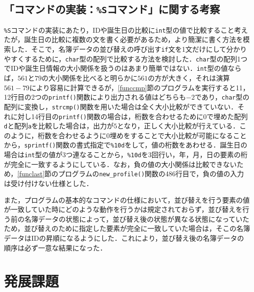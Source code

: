 \subsection{「コマンドの実装：\texttt{\%S}コマンド」に関する考察}

\verb|%S|コマンドの実装にあたり，IDや誕生日の比較に\verb|int|型の値で比較すること考えたが，誕生日の比較に複数の文を書く必要があるため，より簡潔に書く方法を模索した．そこで，名簿データの並び替えの呼び出す\verb|if|文を1文だけにして分かりやすくするために，\verb|char|型の配列で比較する方法を検討した．\verb|char|型の配列1つでIDや誕生日情報の大小関係を扱うのはあまり簡単ではない．\verb|int|型の値ならば，$561$と$79$の大小関係を比べると明らかに$561$の方が大きく，それは演算$561 - 79$により容易に計算できるが，\ref{funccmp}節のプログラムを実行すると11，12行目の2つの\verb|printf()|関数により出力される値はどちらも$-2$であり，\verb|char|型の配列に変換し，\verb|strcmp()|関数を用いた場合は全く大小比較ができていない．それに対し14行目の\verb|printf()|関数の場合は，桁数を合わせるために0で埋めた配列\verb|d|と配列\verb|a|を比較した場合は，出力が$5$となり，正しく大小比較が行えている．このように，桁数を合わせるように0埋めをすることで大小比較が可能になることから，\verb|sprintf()|関数の書式指定で\verb|%10d|をして，値の桁数をあわせる．誕生日の場合は\verb|int|型の値が3つ連なることから，\verb|%10d|を3回行い，年，月，日の要素の桁が完全に一致するようにしている．なお，負の値の大小関係は比較できないため，\ref{funclast}節のプログラムの\verb|new_profile()|関数の486行目で，負の値の入力は受け付けない仕様とした．

また，プログラムの基本的なコマンドの仕様において，並び替えを行う要素の値が一致していた時にどのような動作を行うかは規定されておらず，並び替えを行う前の名簿データの状態によって，並び替え後の状態が異なる状態になっていたため，並び替えのために指定した要素が完全に一致していた場合は，そこの名簿データはIDの昇順になるようにした．これにより，並び替え後の名簿データの順序は必ず一意な結果になった．

\section{発展課題} \label{advancedfunction}

